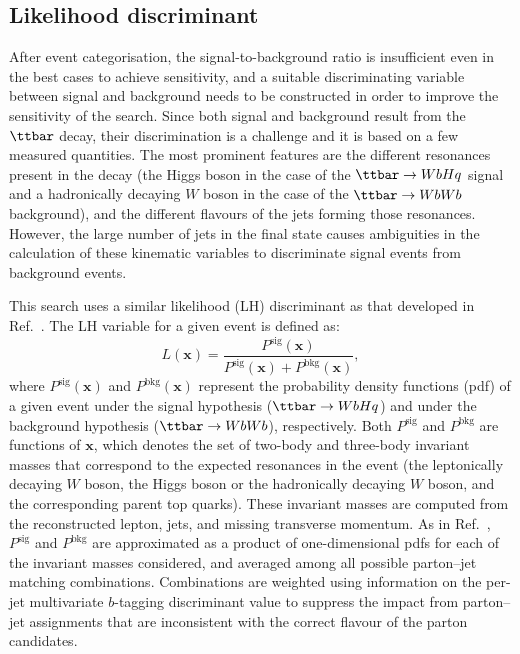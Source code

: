 \subsection{Likelihood discriminant}
\label{sec:likelihood_discriminant}

After event categorisation, the signal-to-background ratio is insufficient even in the best cases to achieve sensitivity, and a suitable
discriminating variable between signal and background needs to be constructed in order to improve the sensitivity of the search.
Since both signal and background result from the $\ttbar$ decay, 
their discrimination is a challenge and it is based on a few measured quantities.  
The most prominent features are the different resonances present in the decay (the Higgs boson in the case 
of the $\Hq$ signal and a hadronically decaying $W$ boson in the case of the $\ttbar \to WbWb$ background), and the different flavours of the 
jets forming those resonances. However, the large number of jets in the final state causes ambiguities in the calculation 
of these kinematic variables to discriminate signal events from background events. 

This search uses a similar likelihood (LH) discriminant as that developed in Ref.~\cite{Aad:2015pja}.
The LH variable for a given event is defined as:
\begin{equation*}
L(\mathbf{x}) = \frac{P^\textrm{sig}(\mathbf{x}) }{P^\textrm{sig}(\mathbf{x}) +P^\textrm{bkg}(\mathbf{x}) },
\label{eq:D}
\end{equation*}
where $P^\textrm{sig}(\mathbf{x}) $ and $P^\textrm{bkg}(\mathbf{x}) $ represent the probability density functions (pdf) of a given event under
the signal hypothesis ($\ttbar \to WbHq$) and under the background hypothesis ($\ttbar \to WbWb$), respectively.
Both $P^\textrm{sig}$ and $P^\textrm{bkg}$ are functions of $\mathbf{x}$, which denotes the set of two-body and three-body invariant masses 
that correspond to the expected resonances in the event (the leptonically decaying $W$ boson, the Higgs boson or the hadronically 
decaying $W$ boson, and the corresponding parent top quarks). These invariant masses are computed from the reconstructed 
lepton, jets, and missing transverse momentum.
As in Ref.~\cite{Aad:2015pja}, $P^\textrm{sig}$ and $P^\textrm{bkg}$ are approximated as a product of one-dimensional pdfs for
each of the invariant masses considered, and averaged among all possible parton--jet matching combinations. 
Combinations are weighted using information on the per-jet multivariate $b$-tagging discriminant value to suppress the impact from 
parton--jet assignments that are inconsistent with the correct flavour of the parton candidates.

